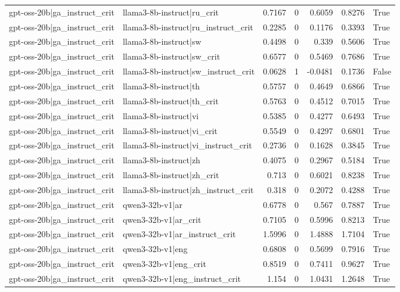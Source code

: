 \begin{table}
\begin{tabular}{l l r r r r l}
gpt-oss-20b|ga_instruct_crit & llama3-8b-instruct|ru_crit & 0.7167 & 0 & 0.6059 & 0.8276 & True \\
gpt-oss-20b|ga_instruct_crit & llama3-8b-instruct|ru_instruct_crit & 0.2285 & 0 & 0.1176 & 0.3393 & True \\
gpt-oss-20b|ga_instruct_crit & llama3-8b-instruct|sw & 0.4498 & 0 & 0.339 & 0.5606 & True \\
gpt-oss-20b|ga_instruct_crit & llama3-8b-instruct|sw_crit & 0.6577 & 0 & 0.5469 & 0.7686 & True \\
gpt-oss-20b|ga_instruct_crit & llama3-8b-instruct|sw_instruct_crit & 0.0628 & 1 & -0.0481 & 0.1736 & False \\
gpt-oss-20b|ga_instruct_crit & llama3-8b-instruct|th & 0.5757 & 0 & 0.4649 & 0.6866 & True \\
gpt-oss-20b|ga_instruct_crit & llama3-8b-instruct|th_crit & 0.5763 & 0 & 0.4512 & 0.7015 & True \\
gpt-oss-20b|ga_instruct_crit & llama3-8b-instruct|vi & 0.5385 & 0 & 0.4277 & 0.6493 & True \\
gpt-oss-20b|ga_instruct_crit & llama3-8b-instruct|vi_crit & 0.5549 & 0 & 0.4297 & 0.6801 & True \\
gpt-oss-20b|ga_instruct_crit & llama3-8b-instruct|vi_instruct_crit & 0.2736 & 0 & 0.1628 & 0.3845 & True \\
gpt-oss-20b|ga_instruct_crit & llama3-8b-instruct|zh & 0.4075 & 0 & 0.2967 & 0.5184 & True \\
gpt-oss-20b|ga_instruct_crit & llama3-8b-instruct|zh_crit & 0.713 & 0 & 0.6021 & 0.8238 & True \\
gpt-oss-20b|ga_instruct_crit & llama3-8b-instruct|zh_instruct_crit & 0.318 & 0 & 0.2072 & 0.4288 & True \\
gpt-oss-20b|ga_instruct_crit & qwen3-32b-v1|ar & 0.6778 & 0 & 0.567 & 0.7887 & True \\
gpt-oss-20b|ga_instruct_crit & qwen3-32b-v1|ar_crit & 0.7105 & 0 & 0.5996 & 0.8213 & True \\
gpt-oss-20b|ga_instruct_crit & qwen3-32b-v1|ar_instruct_crit & 1.5996 & 0 & 1.4888 & 1.7104 & True \\
gpt-oss-20b|ga_instruct_crit & qwen3-32b-v1|eng & 0.6808 & 0 & 0.5699 & 0.7916 & True \\
gpt-oss-20b|ga_instruct_crit & qwen3-32b-v1|eng_crit & 0.8519 & 0 & 0.7411 & 0.9627 & True \\
gpt-oss-20b|ga_instruct_crit & qwen3-32b-v1|eng_instruct_crit & 1.154 & 0 & 1.0431 & 1.2648 & True \\

\end{tabular}
\end{table}
